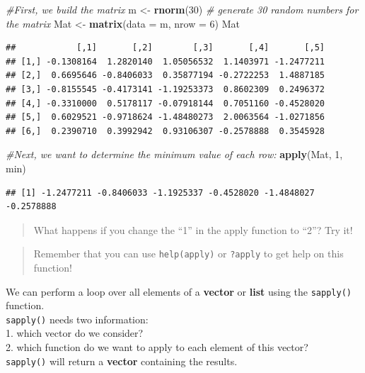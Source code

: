 \documentclass[
]{book}
\newenvironment{Shaded}{\begin{snugshade}}{\end{snugshade}}
\newcommand{\AttributeTok}[1]{\textcolor[rgb]{0.13,0.29,0.53}{#1}}
\newcommand{\CommentTok}[1]{\textcolor[rgb]{0.56,0.35,0.01}{\textit{#1}}}
\newcommand{\DecValTok}[1]{\textcolor[rgb]{0.00,0.00,0.81}{#1}}
\newcommand{\FunctionTok}[1]{\textcolor[rgb]{0.13,0.29,0.53}{\textbf{#1}}}
\newcommand{\NormalTok}[1]{#1}
\newcommand{\OtherTok}[1]{\textcolor[rgb]{0.56,0.35,0.01}{#1}}
\begin{document}
\begin{Shaded}
\begin{Highlighting}[]
\CommentTok{\#First, we build the matrix }
\NormalTok{m }\OtherTok{\textless{}{-}} \FunctionTok{rnorm}\NormalTok{(}\DecValTok{30}\NormalTok{)   }\CommentTok{\# generate 30 random numbers for the matrix}
\NormalTok{Mat }\OtherTok{\textless{}{-}} \FunctionTok{matrix}\NormalTok{(}\AttributeTok{data =}\NormalTok{ m, }\AttributeTok{nrow =} \DecValTok{6}\NormalTok{)}
\NormalTok{Mat}
\end{Highlighting}
\end{Shaded}

\begin{verbatim}
##            [,1]       [,2]        [,3]       [,4]       [,5]
## [1,] -0.1308164  1.2820140  1.05056532  1.1403971 -1.2477211
## [2,]  0.6695646 -0.8406033  0.35877194 -0.2722253  1.4887185
## [3,] -0.8155545 -0.4173141 -1.19253373  0.8602309  0.2496372
## [4,] -0.3310000  0.5178117 -0.07918144  0.7051160 -0.4528020
## [5,]  0.6029521 -0.9718624 -1.48480273  2.0063564 -1.0271856
## [6,]  0.2390710  0.3992942  0.93106307 -0.2578888  0.3545928
\end{verbatim}

\begin{Shaded}
\begin{Highlighting}[]
\CommentTok{\#Next, we want to determine the minimum value of each row: }
\FunctionTok{apply}\NormalTok{(Mat, }\DecValTok{1}\NormalTok{, min)}
\end{Highlighting}
\end{Shaded}

\begin{verbatim}
## [1] -1.2477211 -0.8406033 -1.1925337 -0.4528020 -1.4848027 -0.2578888
\end{verbatim}

\begin{quote}
What happens if you change the ``1'' in the apply function to ``2''?
Try it!
\end{quote}

\begin{quote}
Remember that you can use \texttt{help(apply)} or \texttt{?apply} to get help on this function!
\end{quote}

We can perform a loop over all elements of a \textbf{vector} or \textbf{list} using the \texttt{sapply()} function.\\
\texttt{sapply()} needs two information:\\
1.
which vector do we consider?\\
2.
which function do we want to apply to each element of this vector?\\
\texttt{sapply()} will return a \textbf{vector} containing the results.
\end{document}
